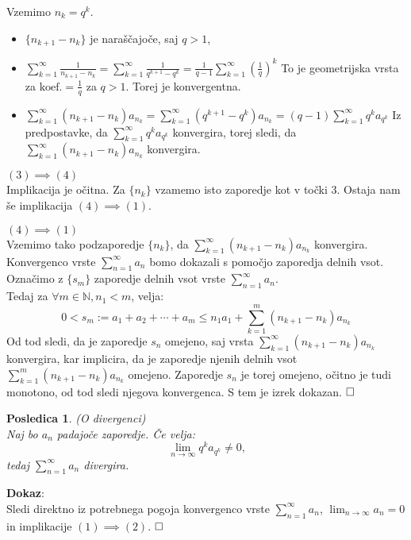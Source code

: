 \documentclass[a4paper,12pt]{article}
\def\N{\mathbb{N}} %
\def\qed{$\hfill\Box$}   %
\newtheorem{posledica}{Posledica}
\begin{document}
Vzemimo ${n_k} = q^k$.
\begin{itemize}
    \item $\{n_{k+1} - n_k\}$ je naraščajoče, saj $ q > 1$,
    \item
    $\sum_{k = 1}^{\infty}{\frac{1}{n_{k+1} - n_k}} = 
    \sum_{k = 1}^{\infty}{\frac{1}{q^{k + 1} - q^k}} =
    \frac{1}{q - 1}\sum_{k = 1}^{\infty}{(\frac{1}{q})^k}$
    To je geometrijska vrsta za $\text{koef.} = \frac{1}{q}$ za $q > 1$. Torej je konvergentna.
    \item 
    $\sum_{k = 1}^{\infty}{(n_{k+1} - n_k)a_{n_k}} =
    \sum_{k = 1}^{\infty}{(q^{k + 1} - q^k)}a_{n_k} =
    (q - 1)\sum_{k = 1}^{\infty}{q^ka_{q^k}}$
    Iz predpostavke, da $\sum_{k = 1}^{\infty}{q^ka_{q^k}}$ konvergira, torej sledi,
    da $\sum_{k = 1}^{\infty}{(n_{k+1} - n_k)a_{n_k}}$ konvergira.
\end{itemize}

\noindent
$(3) \implies (4)$\\

Implikacija je očitna. Za $\{n_k\}$ vzamemo isto zaporedje kot v točki 3.
Ostaja nam še implikacija $(4) \implies (1)$.

\noindent
$(4) \implies (1)$\\
Vzemimo tako podzaporedje  $\{n_k\}$, da $\sum_{k = 1}^{\infty}{(n_{k+1} - n_k)a_{n_k}}$ konvergira.
Konvergenco vrste $\sum_{n = 1}^{\infty}{a_n}$ bomo dokazali s pomočjo zaporedja delnih vsot.
Označimo z $\{s_m\}$ zaporedje delnih vsot vrste $\sum_{n = 1}^{\infty}{a_n}$.\\
Tedaj za $\forall m \in \N, n_1 < m$, velja:
\[
    0 < s_m := a_1 + a_2 + \cdots + a_m \leq n_{1}a_{1} + \sum_{k = 1}^{m}{(n_{k+1} - n_k)a_{n_k}}
\]
Od tod sledi, da je zaporedje ${s_n}$ omejeno, saj vrsta $\sum_{k = 1}^{\infty}{(n_{k+1} - n_k)a_{n_k}}$ konvergira, 
kar implicira, da je zaporedje njenih delnih vsot $\sum_{k = 1}^{m}{(n_{k+1} - n_k)a_{n_k}}$ omejeno.
Zaporedje ${s_n}$ je torej omejeno, očitno je tudi monotono, od tod sledi njegova konvergenca.
S tem je izrek dokazan.
\qed

\begin{posledica}(O divergenci)\\
    Naj bo $a_n$ padajoče zaporedje. Če velja:
    \[
        \lim_{n \to \infty}{q^ka_{q^k}} \neq 0 \text{,} 
    \]
    tedaj $\sum_{n = 1}^{\infty}{a_n}$ divergira.
\end{posledica}

\noindent
\textbf{Dokaz}:\\
Sledi direktno iz potrebnega pogoja konvergenco vrste $\sum_{n = 1}^{\infty}{a_n}$,
$\lim_{n \to \infty}{a_n} = 0$ in implikacije $ (1) \implies (2)$.
\qed
\end{document}
